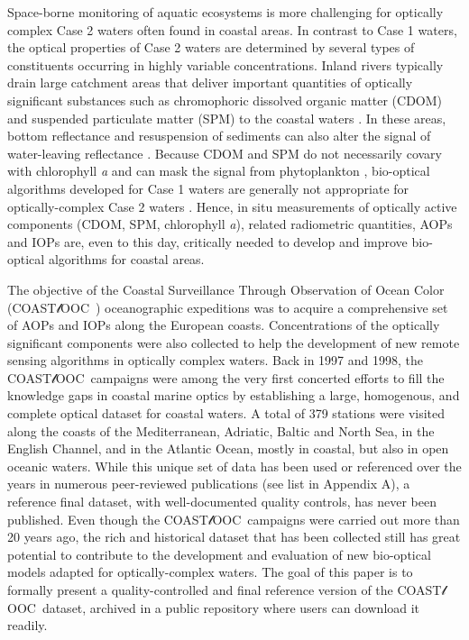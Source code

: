 \documentclass[essd, manuscript]{copernicus}
\newcommand{\coastlooc}{COAST$\mathscr{l}$OOC~\allowbreak}
\begin{document}
Space-borne monitoring of aquatic ecosystems is more challenging for optically complex Case 2 waters \citep{Morel1977} often found in coastal areas. In contrast to Case 1 waters, the optical properties of Case 2 waters are determined by several types of constituents occurring in highly variable concentrations. Inland rivers typically drain large catchment areas that deliver important quantities of optically significant substances such as chromophoric dissolved organic matter (CDOM) and suspended particulate matter (SPM) to the coastal waters \citep{Hedges1997, Cole2007, Massicotte2017}. In these areas, bottom reflectance and resuspension of sediments can also alter the signal of water-leaving reflectance \citep{Lee1998}. Because CDOM and SPM do not necessarily covary with chlorophyll \textit{a} and can mask the signal from phytoplankton \citep{Sathyendranath2000}, bio-optical algorithms developed for Case 1 waters are generally not appropriate for optically-complex Case 2 waters \citep{Gordon1983}. Hence, in situ measurements of optically active components (CDOM, SPM, chlorophyll \textit{a}), related radiometric quantities, AOPs and IOPs are, even to this day, critically needed to develop and improve bio-optical algorithms for coastal areas.

The objective of the Coastal Surveillance Through Observation of Ocean Color (\coastlooc) oceanographic expeditions was to acquire a comprehensive set of AOPs and IOPs along the European coasts. Concentrations of the optically significant components were also collected to help the development of new remote sensing algorithms in optically complex waters. Back in 1997 and 1998, the \coastlooc campaigns were among the very first concerted efforts to fill the knowledge gaps in coastal marine optics by establishing a large, homogenous, and complete optical dataset for coastal waters. A total of 379 stations were visited along the coasts of the Mediterranean, Adriatic, Baltic and North Sea, in the English Channel, and in the Atlantic Ocean, mostly in coastal, but also in open oceanic waters. While this unique set of data has been used or referenced over the years in numerous peer-reviewed publications  (see list in Appendix A), a reference final dataset, with well-documented quality controls, has never been published. Even though the \coastlooc campaigns were carried out more than 20 years ago, the rich and historical dataset that has been collected still has great potential to contribute to the development and evaluation of new bio-optical models adapted for optically-complex waters. The goal of this paper is to formally present a quality-controlled and final reference version of the \coastlooc dataset, archived in a public repository where users can download it readily.
\end{document}
